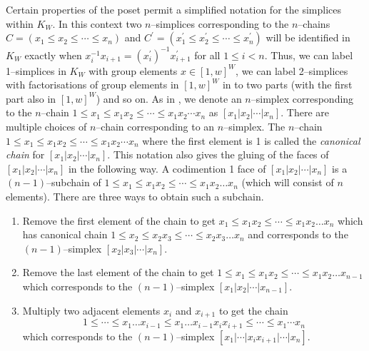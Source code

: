 \documentclass[class=article, crop=false]{standalone}
\begin{document}
Certain properties of the poset permit a simplified notation for the simplices within $K_{W}$. In this context two $n$--simplices corresponding to the $n$--chains $C=(x_1 \leq x_2 \leq \cdots \leq x_n)$ and $C^\prime = (x_1^\prime \leq x_2^\prime \leq \cdots \leq x_n^\prime)$ will be identified in $K_W$ exactly when $x_i^{-1}x_{i+1} = (x^\prime_i)^{-1}x^\prime_{i+1}$ for all $1\leq i <n$. Thus, we can label 1--simplices in $K_{W}$ with group elements $x \in [1,w]^W$, we can label 2--simplices with factorisations of group elements in $[1,w]^W$ in to two parts (with the first part also in $[1,w]^W$) and so on.
As in \cite[Definition 2.8]{paolini_salvetti_kpi1_2021}, we denote an $n$--simplex corresponding to the $n$--chain $1 \leq x_1 \leq x_1x_2 \leq \cdots \leq x_1x_2\cdots x_n$ as $[x_1 | x_2 | \cdots | x_n]$. There are multiple choices of $n$--chain corresponding to an $n$--simplex.
The $n$--chain $1 \leq x_1 \leq x_1x_2 \leq \cdots \leq x_1x_2\cdots x_n$ where the first element is 1 is called the \emph{canonical chain} for $[x_1 | x_2 | \cdots | x_n]$. This notation also gives the gluing of the faces of $[x_1 | x_2 | \cdots | x_n]$ in the following way.
A codimention 1 face of $[x_1 | x_2 | \cdots | x_n]$ is a $(n-1)$--subchain of $1 \leq x_1 \leq x_1x_2 \leq \cdots \leq x_1x_2\ldots x_n$ (which will consist of $n$ elements). There are three ways to obtain such a subchain.
\begin{enumerate}
    \item \label{item:gluing_step_1} Remove the first element of the chain to get $x_1 \leq x_1x_2 \leq \cdots \leq x_1x_2\ldots x_n$ which has canonical chain $1 \leq x_2 \leq x_2x_3 \leq \cdots \leq x_2x_3\ldots x_n$ and corresponds to the $(n-1)$--simplex $[x_2 | x_3 | \cdots | x_n]$.
    \item \label{item:gluing_step_2} Remove the last element of the chain to get $1 \leq x_1 \leq x_1x_2 \leq \cdots \leq x_1x_2\ldots x_{n-1}$ which corresponds to the $(n-1)$--simplex $[x_1 | x_2 | \cdots | x_{n-1}]$.
    \item \label{item:gluing_step_3} Multiply two adjacent elements $x_i$ and $x_{i+1}$ to get the chain
    \begin{equation*}
        1 \leq \cdots \leq x_1 \ldots x_{i-1} \leq x_1 \ldots x_{i-1}x_ix_{i+1} \leq \cdots \leq x_1\cdots x_n
    \end{equation*}
    which corresponds to the $(n-1)$--simplex $[x_1| \cdots | x_ix_{i+1} | \cdots |x_n]$.
\end{enumerate}
\end{document}
